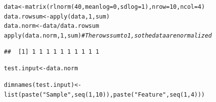 \documentclass{article}\usepackage[]{graphicx}\usepackage[usenames,dvipsnames]{color}
\newcommand{\hlnum}[1]{\textcolor[rgb]{0.816,0.125,0.439}{#1}}%
\newcommand{\hlstr}[1]{\textcolor[rgb]{0.251,0.627,0.251}{#1}}%
\newcommand{\hlcom}[1]{\textcolor[rgb]{0.502,0.502,0.502}{\textit{#1}}}%
\newcommand{\hlopt}[1]{\textcolor[rgb]{0,0,0}{#1}}%
\newcommand{\hlstd}[1]{\textcolor[rgb]{0.251,0.251,0.251}{#1}}%
\newcommand{\hlkwb}[1]{\textcolor[rgb]{0,0,0}{#1}}%
\newcommand{\hlkwc}[1]{\textcolor[rgb]{0.251,0.251,0.251}{#1}}%
\newcommand{\hlkwd}[1]{\textcolor[rgb]{0.878,0.439,0.125}{#1}}%
\newenvironment{knitrout}{}{} %
\begin{document}
\begin{knitrout}
\color{fgcolor}\begin{kframe}
\begin{alltt}
\hlstd{data} \hlkwb{<-} \hlkwd{matrix}\hlstd{(}\hlkwd{rlnorm}\hlstd{(}\hlnum{40}\hlstd{,}\hlkwc{meanlog}\hlstd{=}\hlnum{0}\hlstd{,}\hlkwc{sdlog}\hlstd{=}\hlnum{1}\hlstd{),}\hlkwc{nrow}\hlstd{=}\hlnum{10}\hlstd{,}\hlkwc{ncol}\hlstd{=}\hlnum{4}\hlstd{)}
\hlstd{data.rowsum} \hlkwb{<-} \hlkwd{apply}\hlstd{(data,}\hlnum{1}\hlstd{,sum)}
\hlstd{data.norm} \hlkwb{<-} \hlstd{data}\hlopt{/}\hlstd{data.rowsum}
\hlkwd{apply}\hlstd{(data.norm,}\hlnum{1}\hlstd{,sum)}  \hlcom{# The rows sum to 1, so the data are normalized}
\end{alltt}
\begin{verbatim}
##  [1] 1 1 1 1 1 1 1 1 1 1
\end{verbatim}
\begin{alltt}
\hlstd{test.input} \hlkwb{<-} \hlstd{data.norm}

\hlkwd{dimnames}\hlstd{(test.input)} \hlkwb{<-} \hlkwd{list}\hlstd{(}\hlkwd{paste}\hlstd{(}\hlstr{"Sample"}\hlstd{,}\hlkwd{seq}\hlstd{(}\hlnum{1}\hlstd{,}\hlnum{10}\hlstd{)),}\hlkwd{paste}\hlstd{(}\hlstr{"Feature"}\hlstd{,}\hlkwd{seq}\hlstd{(}\hlnum{1}\hlstd{,}\hlnum{4}\hlstd{)))}


\end{alltt}
\end{kframe}
\end{knitrout}
\end{document}
